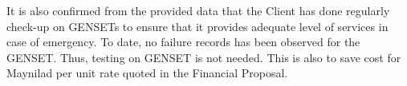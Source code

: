 
%
%		

It is also confirmed from the provided data that the Client has done regularly check-up on GENSETs to ensure that it provides adequate level of services in case of emergency. To date, no failure records has been observed for the GENSET. Thus, testing on GENSET is not needed. This is also to save cost for Maynilad per unit rate quoted in the Financial Proposal.%

